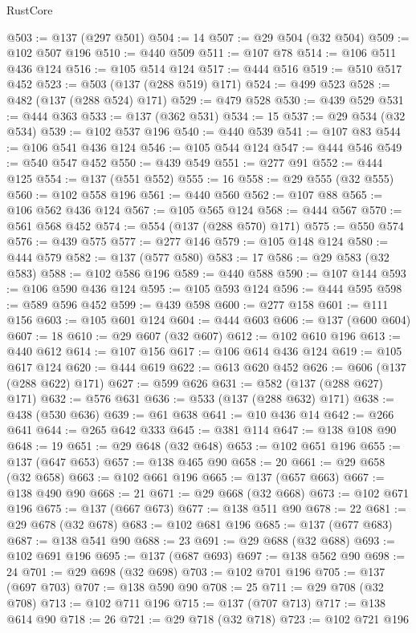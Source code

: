 \begin{lexlean}{RustCore}
\begin{coremodule}
{\begin{coremodule}
{{{{{{{{{{{{{{{{{{{{{{{{{{{{{{{{{{{{{{{{{{{{@503 := @137 (@297 @501)
@504 := 14
@507 := @29 @504 (@32 @504)
@509 := @102 @507 @196
@510 := @440 @509
@511 := @107 @78
@514 := @106 @511 @436 @124
@516 := @105 @514 @124
@517 := @444 @516
@519 := @510 @517 @452
@523 := @503 (@137 (@288 @519) @171)
@524 := @499 @523
@528 := @482 (@137 (@288 @524) @171)
@529 := @479 @528
@530 := @439 @529
@531 := @444 @363
@533 := @137 (@362 @531)
@534 := 15
@537 := @29 @534 (@32 @534)
@539 := @102 @537 @196
@540 := @440 @539
@541 := @107 @83
@544 := @106 @541 @436 @124
@546 := @105 @544 @124
@547 := @444 @546
@549 := @540 @547 @452
@550 := @439 @549
@551 := @277 @91
@552 := @444 @125
@554 := @137 (@551 @552)
@555 := 16
@558 := @29 @555 (@32 @555)
@560 := @102 @558 @196
@561 := @440 @560
@562 := @107 @88
@565 := @106 @562 @436 @124
@567 := @105 @565 @124
@568 := @444 @567
@570 := @561 @568 @452
@574 := @554 (@137 (@288 @570) @171)
@575 := @550 @574
@576 := @439 @575
@577 := @277 @146
@579 := @105 @148 @124
@580 := @444 @579
@582 := @137 (@577 @580)
@583 := 17
@586 := @29 @583 (@32 @583)
@588 := @102 @586 @196
@589 := @440 @588
@590 := @107 @144
@593 := @106 @590 @436 @124
@595 := @105 @593 @124
@596 := @444 @595
@598 := @589 @596 @452
@599 := @439 @598
@600 := @277 @158
@601 := @111 @156
@603 := @105 @601 @124
@604 := @444 @603
@606 := @137 (@600 @604)
@607 := 18
@610 := @29 @607 (@32 @607)
@612 := @102 @610 @196
@613 := @440 @612
@614 := @107 @156
@617 := @106 @614 @436 @124
@619 := @105 @617 @124
@620 := @444 @619
@622 := @613 @620 @452
@626 := @606 (@137 (@288 @622) @171)
@627 := @599 @626
@631 := @582 (@137 (@288 @627) @171)
@632 := @576 @631
@636 := @533 (@137 (@288 @632) @171)
@638 := @438 (@530 @636)
@639 := @61 @638
@641 := @10 @436 @14
@642 := @266 @641
@644 := @265 @642 @333
@645 := @381 @114
@647 := @138 @108 @90
@648 := 19
@651 := @29 @648 (@32 @648)
@653 := @102 @651 @196
@655 := @137 (@647 @653)
@657 := @138 @465 @90
@658 := 20
@661 := @29 @658 (@32 @658)
@663 := @102 @661 @196
@665 := @137 (@657 @663)
@667 := @138 @490 @90
@668 := 21
@671 := @29 @668 (@32 @668)
@673 := @102 @671 @196
@675 := @137 (@667 @673)
@677 := @138 @511 @90
@678 := 22
@681 := @29 @678 (@32 @678)
@683 := @102 @681 @196
@685 := @137 (@677 @683)
@687 := @138 @541 @90
@688 := 23
@691 := @29 @688 (@32 @688)
@693 := @102 @691 @196
@695 := @137 (@687 @693)
@697 := @138 @562 @90
@698 := 24
@701 := @29 @698 (@32 @698)
@703 := @102 @701 @196
@705 := @137 (@697 @703)
@707 := @138 @590 @90
@708 := 25
@711 := @29 @708 (@32 @708)
@713 := @102 @711 @196
@715 := @137 (@707 @713)
@717 := @138 @614 @90
@718 := 26
@721 := @29 @718 (@32 @718)
@723 := @102 @721 @196
}}}}}}}}}}}}}}}}}}}}}}}}}}}}}}}}}}}}}}}}}}}}
\end{coremodule}}
\end{coremodule}
\end{lexlean}
